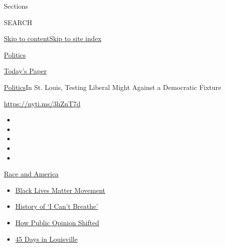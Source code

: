 Sections

SEARCH

\protect\hyperlink{site-content}{Skip to
content}\protect\hyperlink{site-index}{Skip to site index}

\href{https://www.nytimes.com/section/politics}{Politics}

\href{https://myaccount.nytimes.com/auth/login?response_type=cookie\&client_id=vi}{}

\href{https://www.nytimes.com/section/todayspaper}{Today's Paper}

\href{/section/politics}{Politics}\textbar{}In St. Louis, Testing
Liberal Might Against a Democratic Fixture

\url{https://nyti.ms/3hZnT7d}

\begin{itemize}
\item
\item
\item
\item
\item
\end{itemize}

\href{https://www.nytimes.com/news-event/george-floyd-protests-minneapolis-new-york-los-angeles?action=click\&pgtype=Article\&state=default\&region=TOP_BANNER\&context=storylines_menu}{Race
and America}

\begin{itemize}
\tightlist
\item
  \href{https://www.nytimes.com/interactive/2020/07/03/us/george-floyd-protests-crowd-size.html?action=click\&pgtype=Article\&state=default\&region=TOP_BANNER\&context=storylines_menu}{Black
  Lives Matter Movement}
\item
  \href{https://www.nytimes.com/interactive/2020/06/28/us/i-cant-breathe-police-arrest.html?action=click\&pgtype=Article\&state=default\&region=TOP_BANNER\&context=storylines_menu}{History
  of `I Can't Breathe'}
\item
  \href{https://www.nytimes.com/interactive/2020/06/10/upshot/black-lives-matter-attitudes.html?action=click\&pgtype=Article\&state=default\&region=TOP_BANNER\&context=storylines_menu}{How
  Public Opinion Shifted}
\item
  \href{https://www.nytimes.com/interactive/2020/07/16/us/black-lives-matter-protests-louisville-breonna-taylor.html?action=click\&pgtype=Article\&state=default\&region=TOP_BANNER\&context=storylines_menu}{45
  Days in Louisville}
\end{itemize}

